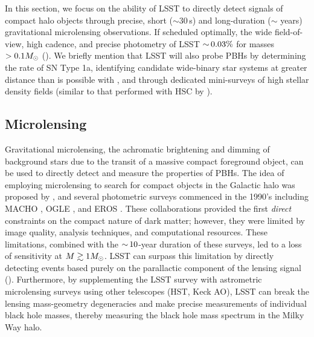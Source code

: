 In this section, we focus on the ability of LSST to directly detect signals of compact halo objects through precise, short ($\sim30\,$s) and long-duration ($\sim$ years) gravitational microlensing observations.
If scheduled optimally, the wide field-of-view, high cadence, and precise photometry of LSST  $ {\sim}\, 0.03\%$ for masses $>0.1M_\odot$ ().
We briefly mention that LSST will also probe PBHs by determining the rate of SN Type 1a, identifying candidate wide-binary star systems at greater distance than is possible with \Gaia, and through dedicated mini-surveys of high stellar density fields (similar to that performed with HSC by \citealt{1701.02151}).


\subsection{Microlensing}
\label{sec:microlensing}

Gravitational microlensing, the achromatic brightening and dimming of background stars due to the transit of a massive compact foreground object, can be used to directly detect and measure the properties of PBHs.
The idea of employing microlensing to search for compact objects in the Galactic halo was proposed by \citet{1986ApJ...304....1P}, and several photometric surveys commenced in the 1990's including MACHO \citep{1992ASPC...34..193A}, OGLE \citep{1992AcA....42..253U}, and EROS \citep{1993Msngr..72...20A}.
These collaborations provided the first \emph{direct} constraints on the compact nature of dark matter; however, they were limited by image quality, analysis techniques, and computational resources.
These limitations, combined with the $ {\sim}\,10$-year duration of these surveys, led to a loss of sensitivity at $M \gtrsim 1 M_\odot$.
LSST can surpass this limitation by directly detecting events based purely on the parallactic component of the lensing signal ().
Furthermore, by supplementing the LSST survey with astrometric microlensing surveys using other telescopes (HST, Keck AO), LSST can break the lensing mass-geometry degeneracies and make precise measurements of individual black hole masses, thereby measuring the black hole mass spectrum in the Milky Way halo.

